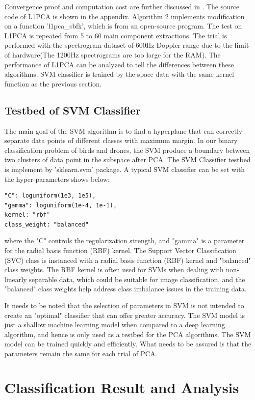 \documentclass{cta-author}
\begin{document}
Convergence proof and computation cost are further discussed in \cite{27}. 
The source code of L1PCA is shown in the appendix. Algorithm 2 implements modification on a function 'l1pca\_sbfk', which is from an open-source program. 
The test on L1PCA is repeated from 5 to 60 main component extractions. The trial is performed with the spectrogram dataset of 600Hz Doppler range due to the limit of hardware(The 1200Hz spectrograms are too large for the RAM). The performance of L1PCA can be analyzed to tell the differences between these algorithms.
SVM classifier is trained by the space data with the same kernel function as the previous section.

\subsection{Testbed of SVM Classifier}
The main goal of the SVM algorithm is to find a hyperplane that can correctly separate data points of different classes with maximum margin.
In our binary classification problem of birds and drones, the SVM produce a boundary between two clusters of data point in the subspace after PCA.
The SVM Classifier testbed is implement by 'sklearn.svm' package.
A typical SVM classifier can be set with the hyper-parameters shows below:
\lstset{language = python}
\begin{lstlisting}
"C": loguniform(1e3, 1e5),
"gamma": loguniform(1e-4, 1e-1),
kernel: "rbf" 
class_weight: "balanced"
\end{lstlisting}
where the "C" controls the regularization strength, and "gamma" is a parameter for the radial basis function (RBF) kernel. 
The Support Vector Classification (SVC) class is instanced with a radial basis function (RBF) kernel and "balanced" class weights. 
The RBF kernel is often used for SVMs when dealing with non-linearly separable data, which could be suitable for image classification, and the "balanced" class weights help address class imbalance issues in the training data.

It needs to be noted that the selection of parameters in SVM is not intended to create an "optimal" classifier that can offer greater accuracy. The SVM model is just a shallow machine learning model when compared to a deep learning algorithm, and hence is only used as a testbed for the PCA algorithms. The SVM model can be trained quickly and efficiently. 
What needs to be assured is that the parameters remain the same for each trial of PCA.
\section{Classification Result and Analysis}
\end{document}
